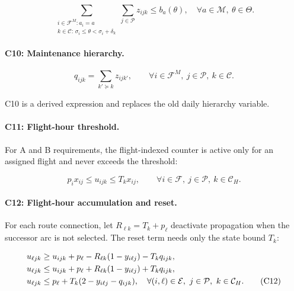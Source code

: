 \documentclass[11pt,a4paper]{article}
\newcommand{\F}{\mathcal{F}}
\newcommand{\Pset}{\mathcal{P}}
\newcommand{\Cset}{\mathcal{C}}
\newcommand{\Eset}{\mathcal{E}}
\newcommand{\Mset}{\mathcal{M}}
\begin{document}
\begin{equation}
  \sum_{\substack{i\in\F^M:a_i=a\\
                    k\in\Cset:\,\sigma_i\leq\theta<\sigma_i+\delta_k}}
  \sum_{j\in\Pset}z_{ijk}
  \leq b_a(\theta),
  \quad \forall a\in\Mset,\ \theta\in\Theta.
  \tag{C9}\label{eq:event_c9}
\end{equation}

\paragraph{C10: Maintenance hierarchy.}

\begin{equation}
  q_{ijk}=\sum_{k'\succeq k}z_{ijk'},
  \qquad \forall i\in\F^M,\ j\in\Pset,\ k\in\Cset.
  \tag{C10}\label{eq:event_c10}
\end{equation}

C10 is a derived expression and replaces the old daily hierarchy variable.

\paragraph{C11: Flight-hour threshold.}
For A and B requirements, the flight-indexed counter is active only for an
assigned flight and never exceeds the threshold:

\begin{equation}
  p_i x_{ij}\leq u_{ijk}\leq T_kx_{ij},
  \qquad \forall i\in\F,\ j\in\Pset,\ k\in\Cset_H.
  \tag{C11}\label{eq:event_c11}
\end{equation}

\paragraph{C12: Flight-hour accumulation and reset.}
For each route connection, let $R_{\ell k}=T_k+p_\ell$ deactivate propagation
when the successor arc is not selected. The reset term needs only the state
bound $T_k$:

\begin{align}
  u_{\ell jk}
  &\geq u_{ijk}+p_\ell
    -R_{\ell k}(1-y_{i\ell j})-T_kq_{ijk},
    \notag\\
  u_{\ell jk}
  &\leq u_{ijk}+p_\ell
    +R_{\ell k}(1-y_{i\ell j})+T_kq_{ijk},
    \notag\\
  u_{\ell jk}
  &\leq p_\ell+T_k(2-y_{i\ell j}-q_{ijk}),
  \quad
  \forall(i,\ell)\in\Eset,\ j\in\Pset,\ k\in\Cset_H.
  \tag{C12}\label{eq:event_c12}
\end{align}
\end{document}
